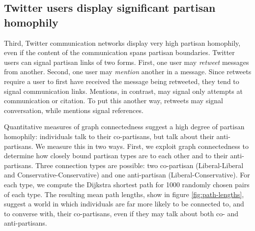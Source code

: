 \documentclass{acm_proc_article-sp}
\begin{document}

\subsection{Twitter users display significant partisan homophily}
\label{sec:twitt-users-displ}


Third, Twitter communication networks display very high partisan
homophily, even if the content of the communication spans partisan
boundaries. Twitter users can signal partisan links of two
forms. First, one user may \textit{retweet} messages from
another. Second, one user may \textit{mention} another in a
message. Since retweets require a user to first have received the
message being retweeted, they tend to signal communication
links. Mentions, in contrast, may signal only attempts at
communication or citation. To put this another way, retweets may
signal conversation, while mentions signal references.

Quantitative measures of graph connectedness suggest a high degree of
partisan homophily: individuals talk to their co-partisans, but talk
about their anti-partisans. We measure this in two ways. First, we
exploit graph connectedness to determine how closely bound partisan
types are to each other and to their anti-partisans. Three connection
types are possible: two co-partisan (Liberal-Liberal and
Conservative-Conservative) and one anti-partisan
(Liberal-Conservative). For each type, we compute the Dijkstra
shortest path for 1000 randomly chosen pairs of each type. The resulting
mean path lengths, show in figure \ref{fig:path-lengths}, suggest a world in which
individuals are far more likely to be connected to, and to converse
with, their co-partisans, even if they may talk about both co- and
anti-partisans.
\end{document}
